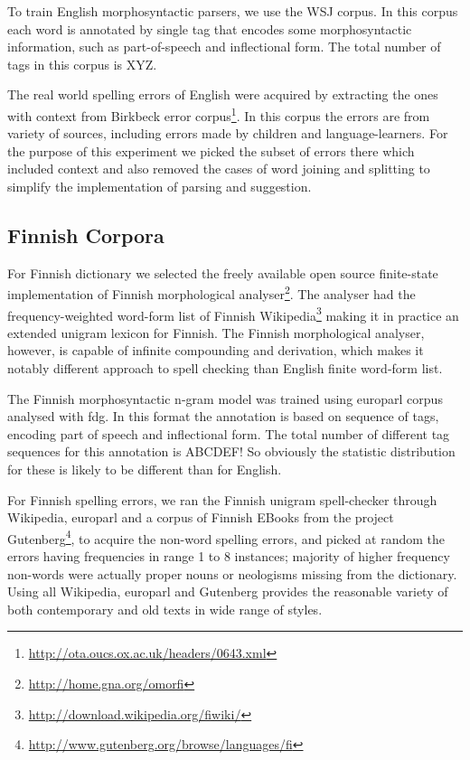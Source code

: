 \documentclass[11pt,a4paper]{article}
\begin{document}
To train English morphosyntactic parsers, we use the WSJ corpus. In
this corpus each word is annotated by single tag that encodes some
morphosyntactic information, such as part-of-speech and inflectional form. The
total number of tags in this corpus is XYZ.

The real world spelling errors of English were acquired by extracting the ones
with context from Birkbeck error
corpus\footnote{\url{http://ota.oucs.ox.ac.uk/headers/0643.xml}}. In this
corpus the errors are from variety of sources, including errors made by
children and language-learners. For the purpose of this experiment we picked
the subset of errors there which included context and also removed the cases of
word joining and splitting to simplify the implementation of parsing and
suggestion.

\subsection{Finnish Corpora}

For Finnish dictionary we selected the freely available open source
finite-state implementation of Finnish morphological
analyser\footnote{\url{http://home.gna.org/omorfi}}. The analyser had the
frequency-weighted word-form list of Finnish
Wikipedia\footnote{\url{http://download.wikipedia.org/fiwiki/}} making it in
practice an extended unigram lexicon for Finnish. The Finnish morphological
analyser, however, is capable of infinite compounding and derivation, which
makes it notably different approach to spell checking than English finite
word-form list. 

The Finnish morphosyntactic n-gram model was trained using europarl corpus
analysed with fdg. In this format the annotation is based on sequence of
tags, encoding part of speech and inflectional form. The total number of
different tag sequences for this annotation is ABCDEF! So obviously the
statistic distribution for these is likely to be different than for English.

For Finnish spelling errors, we ran the Finnish unigram spell-checker through
Wikipedia, europarl and a corpus of Finnish EBooks from the project
Gutenberg\footnote{\url{http://www.gutenberg.org/browse/languages/fi}}, to
acquire the non-word spelling errors, and picked at random the errors having
frequencies in range 1 to 8 instances; majority of higher frequency non-words
were actually proper nouns or neologisms missing from the dictionary. Using all
Wikipedia, europarl and Gutenberg provides the reasonable variety of both
contemporary and old texts in wide range of styles.
\end{document}

